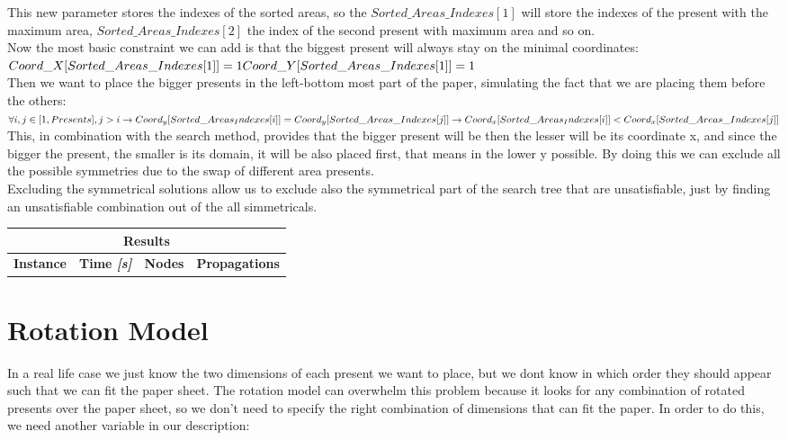 This new parameter stores the indexes of the sorted areas, so the $Sorted\_Areas\_Indexes[1]$ will store the indexes of the present with
the maximum area, $Sorted\_Areas\_Indexes[2]$ the index of the second present with maximum area and so on.\\
Now the most basic constraint we can add is that the biggest present will always stay on the minimal coordinates:\\
$
Coord\_X[Sorted\_Areas\_Indexes[1]] = 1\\
Coord\_Y[Sorted\_Areas\_Indexes[1]] = 1
$
\\

Then we want to place the bigger presents in the left-bottom most part of the paper, simulating the fact that we are placing them before
the others:\\
$
\forall i, j \in [1, Presents], j > i \rightarrow \\
    Coord_y[Sorted\_Areas_Indexes[i]] = Coord_y[Sorted\_Areas\_Indexes[j]] \rightarrow \\
    Coord_x[Sorted\_Areas_Indexes[i]] < Coord_x[Sorted\_Areas\_Indexes[j]]
$
\\
This, in combination with the search method, provides that the bigger present will be then the lesser will be its coordinate x,
and since the bigger the present, the smaller is its domain, it will be also placed first, that means in the lower y possible.
By doing this we can exclude all the possible symmetries due to the swap of different area presents.\\
Excluding the symmetrical solutions allow us to exclude also the symmetrical part of the search tree that are unsatisfiable, just
by finding an unsatisfiable combination out of the all simmetricals.


\begin{center}
    \begin{tabular}{|c|c|c|c|}
        \hline
        \multicolumn{4}{|c|}{\textbf{Results}} \\
        \hline
        \textbf{Instance} & \textbf{Time \textit{[s]}} & \textbf{Nodes} & \textbf{Propagations} \\
        \hline
    \end{tabular}
\end{center}


\section{Rotation Model}
In a real life case we just know the two dimensions of each present we want to place, but we dont know in which order they should appear such that we can fit the paper sheet.
The rotation model can overwhelm this problem because it looks for any combination of rotated presents over the paper sheet, so we don't need to specify the right combination
of dimensions that can fit the paper. In order to do this, we need another variable in our description:

